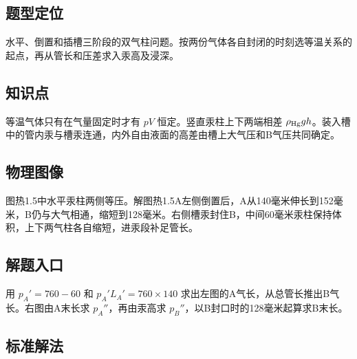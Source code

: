 \documentclass[UTF8,fontset=fandol,a4paper,11pt]{ctexart}
\begin{document}


\subsection*{题型定位}

水平、倒置和插槽三阶段的双气柱问题。按两份气体各自封闭的时刻选等温关系的起点，再从管长和压差求入汞高及浸深。



\subsection*{知识点}

等温气体只有在气量固定时才有 $pV$ 恒定。竖直汞柱上下两端相差 $\rho_{\rm Hg}gh$。装入槽中的管内汞与槽汞连通，内外自由液面的高差由槽上大气压和B气压共同确定。



\subsection*{物理图像}

图热1.5中水平汞柱两侧等压。解图热1.5A左侧倒置后，A从140毫米伸长到152毫米，B仍与大气相通，缩短到128毫米。右侧槽汞封住B，中间60毫米汞柱保持体积，上下两气柱各自缩短，进汞段补足管长。



\subsection*{解题入口}

用 $p_A'=760-60$ 和 $p_A'L_A'=760\times140$ 求出左图的A气长，从总管长推出B气长。右图由A末长求 $p_A''$，再由汞高求 $p_B''$，以B封口时的128毫米起算求B末长。



\subsection*{标准解法}
\end{document}
